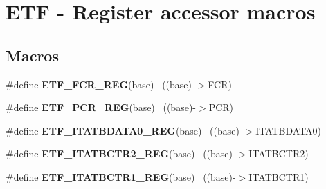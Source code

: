 \hypertarget{group___e_t_f___register___accessor___macros}{}\section{E\+T\+F -\/ Register accessor macros}
\label{group___e_t_f___register___accessor___macros}
\subsection*{Macros}
\begin{DoxyCompactItemize}
\item 
\hypertarget{group___e_t_f___register___accessor___macros_ga3a6090c96a97fedec3eecc70692c9281}{}\#define {\bfseries E\+T\+F\+\_\+\+F\+C\+R\+\_\+\+R\+E\+G}(base)                                            ~((base)-\/$>$F\+C\+R)\label{group___e_t_f___register___accessor___macros_ga3a6090c96a97fedec3eecc70692c9281}

\item 
\hypertarget{group___e_t_f___register___accessor___macros_ga7f09a0cf0ce3ad36eaebb2ece85082bb}{}\#define {\bfseries E\+T\+F\+\_\+\+P\+C\+R\+\_\+\+R\+E\+G}(base)                                            ~((base)-\/$>$P\+C\+R)\label{group___e_t_f___register___accessor___macros_ga7f09a0cf0ce3ad36eaebb2ece85082bb}

\item 
\hypertarget{group___e_t_f___register___accessor___macros_ga86a704f3527d5df411f99ec8f9676d3d}{}\#define {\bfseries E\+T\+F\+\_\+\+I\+T\+A\+T\+B\+D\+A\+T\+A0\+\_\+\+R\+E\+G}(base)                              ~((base)-\/$>$I\+T\+A\+T\+B\+D\+A\+T\+A0)\label{group___e_t_f___register___accessor___macros_ga86a704f3527d5df411f99ec8f9676d3d}

\item 
\hypertarget{group___e_t_f___register___accessor___macros_gaa9b800e446803bbceb31252ffb731292}{}\#define {\bfseries E\+T\+F\+\_\+\+I\+T\+A\+T\+B\+C\+T\+R2\+\_\+\+R\+E\+G}(base)                                ~((base)-\/$>$I\+T\+A\+T\+B\+C\+T\+R2)\label{group___e_t_f___register___accessor___macros_gaa9b800e446803bbceb31252ffb731292}

\item 
\hypertarget{group___e_t_f___register___accessor___macros_ga44f6405ca9c25db97a240bd1aed17297}{}\#define {\bfseries E\+T\+F\+\_\+\+I\+T\+A\+T\+B\+C\+T\+R1\+\_\+\+R\+E\+G}(base)                                ~((base)-\/$>$I\+T\+A\+T\+B\+C\+T\+R1)\label{group___e_t_f___register___accessor___macros_ga44f6405ca9c25db97a240bd1aed17297}


\end{DoxyCompactItemize}
